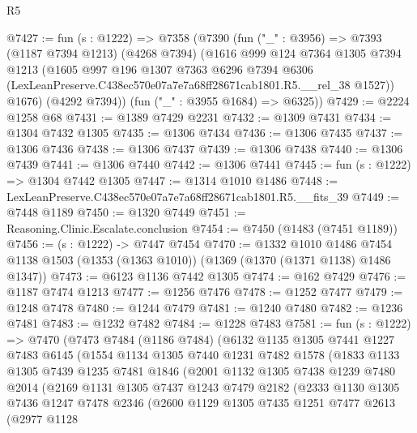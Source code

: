 \begin{lexlean}{R5}
\begin{coremodule}
@7427 := fun (s : @1222) =>
  @7358
    (@7390
      (fun ("_" : @3956) =>
      @7393
        (@1187 @7394 @1213)
        (@4268 @7394)
        (@1616
          @999
          @124
          @7364
          @1305
          @7394
          @1213
          (@1605
            @997
            @196
            @1307
            @7363
            @6296
            @7394
            @6306
            (LexLeanPreserve.C438ec570e07a7e7a68ff28671cab1801.R5.__rel_38 @1527))
          @1676)
        (@4292 @7394))
      (fun ("_" : @3955 @1684) => @6325))
@7429 := @2224 @1258 @68
@7431 := @1389 @7429 @2231
@7432 := @1309 @7431
@7434 := @1304 @7432 @1305
@7435 := @1306 @7434
@7436 := @1306 @7435
@7437 := @1306 @7436
@7438 := @1306 @7437
@7439 := @1306 @7438
@7440 := @1306 @7439
@7441 := @1306 @7440
@7442 := @1306 @7441
@7445 := fun (s : @1222) => @1304 @7442 @1305
@7447 := @1314 @1010 @1486
@7448 := LexLeanPreserve.C438ec570e07a7e7a68ff28671cab1801.R5.__fits_39
@7449 := @7448 @1189
@7450 := @1320 @7449
@7451 := Reasoning.Clinic.Escalate.conclusion
@7454 := @7450 (@1483 (@7451 @1189))
@7456 := (s : @1222) -> @7447 @7454
@7470 := @1332
    @1010
    @1486
    @7454
    @1138
    @1503
    (@1353 (@1363 @1010))
    (@1369 (@1370 (@1371 @1138) @1486 @1347))
@7473 := @6123 @1136 @7442 @1305
@7474 := @162 @7429
@7476 := @1187 @7474 @1213
@7477 := @1256 @7476
@7478 := @1252 @7477
@7479 := @1248 @7478
@7480 := @1244 @7479
@7481 := @1240 @7480
@7482 := @1236 @7481
@7483 := @1232 @7482
@7484 := @1228 @7483
@7581 := fun (s : @1222) =>
  @7470
    (@7473
      @7484
      (@1186 @7484)
      (@6132
        @1135
        @1305
        @7441
        @1227
        @7483
        @6145
        (@1554
          @1134
          @1305
          @7440
          @1231
          @7482
          @1578
          (@1833
            @1133
            @1305
            @7439
            @1235
            @7481
            @1846
            (@2001
              @1132
              @1305
              @7438
              @1239
              @7480
              @2014
              (@2169
                @1131
                @1305
                @7437
                @1243
                @7479
                @2182
                (@2333
                  @1130
                  @1305
                  @7436
                  @1247
                  @7478
                  @2346
                  (@2600
                    @1129
                    @1305
                    @7435
                    @1251
                    @7477
                    @2613
                    (@2977
                      @1128

\end{coremodule}
\end{lexlean}
